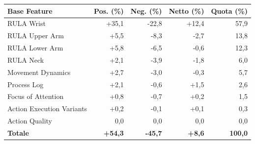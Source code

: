 \begin{tabular*}{\linewidth}{@{}l@{\extracolsep{\fill}}rrrr@{}}
\toprule
\textbf{Base Feature} & \textbf{Pos. (\%)} & \textbf{Neg. (\%)} & \textbf{Netto (\%)} & \textbf{Quota (\%)} \\
\midrule
RULA Wrist & +35{,}1 & -22{,}8 & +12{,}4 & 57{,}9 \\
RULA Upper Arm & +5{,}5 & -8{,}3 & -2{,}7 & 13{,}8 \\
RULA Lower Arm & +5{,}8 & -6{,}5 & -0{,}6 & 12{,}3 \\
RULA Neck & +2{,}1 & -3{,}9 & -1{,}8 & 6{,}0 \\
Movement Dynamics & +2{,}7 & -3{,}0 & -0{,}3 & 5{,}7 \\
Process Log & +2{,}1 & -0{,}6 & +1{,}5 & 2{,}6 \\
Focus of Attention & +0{,}8 & -0{,}7 & +0{,}2 & 1{,}5 \\
Action Execution Variants & +0{,}2 & -0{,}1 & +0{,}1 & 0{,}3 \\
Action Quality & 0{,}0 & 0{,}0 & 0{,}0 & 0{,}0 \\
\midrule
\textbf{Totale} & \textbf{+54{,}3} & \textbf{-45{,}7} & \textbf{+8{,}6} & \textbf{100{,}0} \\
\bottomrule
\end{tabular*}
